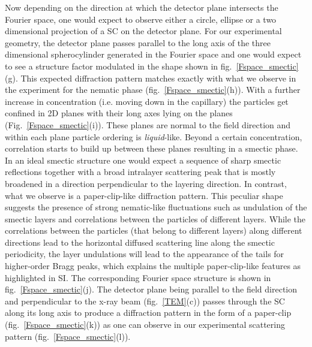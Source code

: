\documentclass[aps,prl,preprint,superscriptaddress]{revtex4-1}
\begin{document}
Now depending on the direction at which the detector plane intersects the Fourier space, one would expect to observe either a circle, ellipse or a two dimensional projection of a SC on the detector plane. For our experimental geometry, the detector plane passes parallel to the long axis of the three dimensional spherocylinder generated in the Fourier space and one would expect to see a structure factor modulated in the shape shown in fig.~\ref{Fspace_smectic}(g). This expected diffraction pattern matches exactly with what we observe in the experiment for the nematic phase (fig.~\ref{Fspace_smectic}(h)). With a further increase in concentration (i.e. moving down in the capillary) the particles get confined in 2D planes with their long axes lying on the planes (Fig.~\ref{Fspace_smectic}(i)). These planes are normal to the field direction and within each plane particle ordering is \emph{liquid}-like. Beyond a certain concentration, correlation starts to build up between these planes resulting in a smectic phase. In an ideal smectic structure one would expect a sequence of sharp smectic reflections together with a broad intralayer scattering peak that is mostly broadened in a direction perpendicular to the layering direction. In contrast, what we observe is a paper-clip-like diffraction pattern. This peculiar shape suggests the presence of strong nematic-like fluctuations such as undulation of the smectic layers and correlations between the particles of different layers. While the correlations between the particles (that belong to different layers) along different directions lead to the horizontal diffused scattering line along the smectic periodicity, the layer undulations will lead to the appearance of the tails for higher-order Bragg peaks, which explains the multiple paper-clip-like features as highlighted in SI. The corresponding Fourier space structure is shown in fig.~\ref{Fspace_smectic}(j). The detector plane being parallel to the field direction and perpendicular to the x-ray beam (fig.~\ref{TEM}(c)) passes through the SC along its long axis to produce a diffraction pattern in the form of a paper-clip (fig.~\ref{Fspace_smectic}(k)) as one can observe in our experimental scattering pattern (fig.~\ref{Fspace_smectic}(l)).\par
\end{document}
